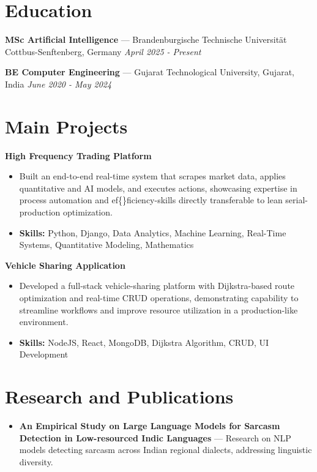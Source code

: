 \documentclass[a4paper,10pt]{article}
\begin{document}
\section*{Education}
\textbf{MSc Artificial Intelligence} — Brandenburgische Technische Universität Cottbus-Senftenberg, Germany \hfill \textit{April 2025 - Present}\par
\vspace{1.5pt}
\textbf{BE Computer Engineering} — Gujarat Technological University, Gujarat, India \hfill \textit{June 2020 - May 2024}\par

\section*{Main Projects}
\textbf{High Frequency Trading Platform}\par
\vspace{1pt}
\begin{itemize}
  \item Built an end-to-end real-time system that scrapes market data, applies quantitative and AI models, and executes actions, showcasing expertise in process automation and ef\{\}ficiency-skills directly transferable to lean serial-production optimization.
  \item \textbf{Skills:} Python, Django, Data Analytics, Machine Learning, Real-Time Systems, Quantitative Modeling, Mathematics
\end{itemize}
\vspace{3pt}
\textbf{Vehicle Sharing Application}\par
\vspace{1pt}
\begin{itemize}
  \item Developed a full-stack vehicle-sharing platform with Dijkstra-based route optimization and real-time CRUD operations, demonstrating capability to streamline workflows and improve resource utilization in a production-like environment.
  \item \textbf{Skills:} NodeJS, React, MongoDB, Dijkstra Algorithm, CRUD, UI Development
\end{itemize}

\section*{Research and Publications}
\begin{itemize}
\item \textbf{An Empirical Study on Large Language Models for Sarcasm Detection in Low-resourced Indic Languages} — Research on NLP models detecting sarcasm across Indian regional dialects, addressing linguistic diversity.
\end{itemize}
\end{document}
